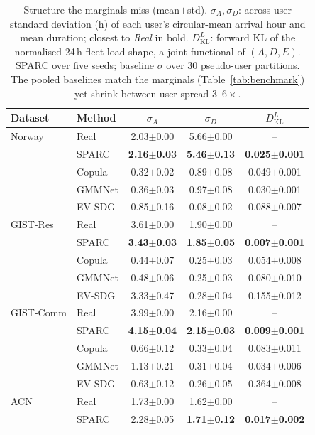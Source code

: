 \begin{table}[t]
\centering
\caption{Structure the marginals miss (mean$\pm$std). $\sigma_A,\sigma_D$: across-user standard deviation (h) of each user's circular-mean arrival hour and mean duration; closest to \emph{Real} in bold. $D_{\mathrm{KL}}^{L}$: forward KL of the normalised 24\,h fleet load shape, a joint functional of $(A,D,E)$. SPARC over five seeds; baseline $\sigma$ over 30 pseudo-user partitions. The pooled baselines match the marginals (Table~\ref{tab:benchmark}) yet shrink between-user spread $3$--$6\times$.}
\label{tab:heterogeneity}
\begin{tabular}{llccc}
\toprule
Dataset & Method & $\sigma_A$ & $\sigma_D$ & $D_{\mathrm{KL}}^{L}$ \\
\midrule
Norway & Real & 2.03$\pm$0.00 & 5.66$\pm$0.00 & -- \\
 & SPARC & \textbf{2.16$\pm$0.03} & \textbf{5.46$\pm$0.13} & \textbf{0.025$\pm$0.001} \\
 & Copula & 0.32$\pm$0.02 & 0.89$\pm$0.08 & 0.049$\pm$0.001 \\
 & GMMNet & 0.36$\pm$0.03 & 0.97$\pm$0.08 & 0.030$\pm$0.001 \\
 & EV-SDG & 0.85$\pm$0.16 & 0.08$\pm$0.02 & 0.088$\pm$0.007 \\
\midrule
GIST-Res & Real & 3.61$\pm$0.00 & 1.90$\pm$0.00 & -- \\
 & SPARC & \textbf{3.43$\pm$0.03} & \textbf{1.85$\pm$0.05} & \textbf{0.007$\pm$0.001} \\
 & Copula & 0.44$\pm$0.07 & 0.25$\pm$0.03 & 0.054$\pm$0.008 \\
 & GMMNet & 0.48$\pm$0.06 & 0.25$\pm$0.03 & 0.080$\pm$0.010 \\
 & EV-SDG & 3.33$\pm$0.47 & 0.28$\pm$0.04 & 0.155$\pm$0.012 \\
\midrule
GIST-Comm & Real & 3.99$\pm$0.00 & 2.16$\pm$0.00 & -- \\
 & SPARC & \textbf{4.15$\pm$0.04} & \textbf{2.15$\pm$0.03} & \textbf{0.009$\pm$0.001} \\
 & Copula & 0.66$\pm$0.12 & 0.33$\pm$0.04 & 0.083$\pm$0.011 \\
 & GMMNet & 1.13$\pm$0.21 & 0.31$\pm$0.04 & 0.034$\pm$0.006 \\
 & EV-SDG & 0.63$\pm$0.12 & 0.26$\pm$0.05 & 0.364$\pm$0.008 \\
\midrule
ACN & Real & 1.73$\pm$0.00 & 1.62$\pm$0.00 & -- \\
 & SPARC & 2.28$\pm$0.05 & \textbf{1.71$\pm$0.12} & \textbf{0.017$\pm$0.002} \\

\end{tabular}
\end{table}
